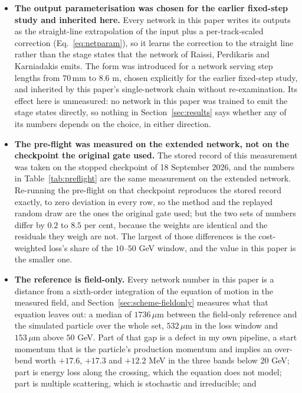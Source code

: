 \documentclass[11pt,a4paper]{article}
\newcommand{\um}{\ensuremath{\,\mu\mathrm{m}}}
\newcommand{\mm}{\ensuremath{\,\mathrm{mm}}}
\begin{document}
\begin{itemize}
  They do not say what a network trained under any of them would do, and no such
  network exists.
  \item \textbf{The output parameterisation was chosen for the earlier fixed-step study
  and inherited here.} Every
  network in this paper writes its outputs as the straight-line extrapolation of
  the input plus a per-track-scaled correction (Eq.~\eqref{eq:netparam}), so it
  learns the correction to the straight line rather than the stage states that
  the network of Raissi, Perdikaris and Karniadakis emits. The form was
  introduced for a network serving step lengths from $70\mm$ to $8.6$ m, chosen
  explicitly for the earlier fixed-step study, and inherited by this paper's
  single-network chain without re-examination. Its effect here
  is unmeasured: no network in this paper was trained to emit the stage states
  directly, so nothing in Section~\ref{sec:results} says whether any of its
  numbers depends on the choice, in either direction.
  \item \textbf{The pre-flight was measured on the extended network, not on the
  checkpoint the original gate used.} The stored record of this measurement was
  taken on the stopped checkpoint of 18 September 2026, and the numbers in
  Table~\ref{tab:preflight} are the same measurement on the extended network.
  Re-running the pre-flight on that checkpoint reproduces the stored record
  exactly, to zero deviation in every row, so the method and the replayed random
  draw are the ones the original gate used; but the two sets of numbers differ
  by $0.2$ to $8.5$ per cent, because the weights are identical and the
  residuals they weigh are not. The largest of those differences is the
  cost-weighted loss's share of the $10$--$50$ GeV window, and the value in this
  paper is the smaller one.
  \item \textbf{The reference is field-only.} Every network number in this paper
  is a distance from a sixth-order integration of the equation of motion in the
  measured field, and Section~\ref{sec:scheme-fieldonly} measures what that
  equation leaves out: a median of $1736\um$ between the field-only reference
  and the simulated particle over the whole set, $532\um$ in the loss window and
  $153\um$ above $50$ GeV. Part of that gap is a defect in my own pipeline, a
  start momentum that is the particle's production momentum and implies an
  over-bend worth $+17.6$, $+17.3$ and $+12.2$ MeV in the three bands below
  $20$ GeV; part is energy loss along the crossing, which the equation does not
  model; part is multiple scattering, which is stochastic and irreducible; and

\end{itemize}
\end{document}
